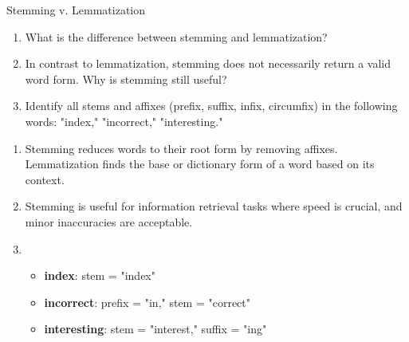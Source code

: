 \documentclass{article}
\begin{document}
\begin{exercise}{Stemming v. Lemmatization}\label{ex:stem-v-lemm}
  \begin{enumerate}
    \item What is the difference between stemming and lemmatization?
    \item In contrast to lemmatization, stemming does not necessarily return a valid word form. Why is stemming still useful?
    \item Identify all stems and affixes (prefix, suffix, infix, circumfix) in the following words: "index," "incorrect," "interesting."
  \end{enumerate}

  \begin{solution}
    \begin{enumerate}
        \item Stemming reduces words to their root form by removing affixes. Lemmatization finds the base or dictionary form of a word based on its context.
        \item Stemming is useful for information retrieval tasks where speed is crucial, and minor inaccuracies are acceptable.
        \item \begin{itemize}
            \item \textbf{index}: stem = "index"
            \item \textbf{incorrect}: prefix = "in," stem = "correct"
            \item \textbf{interesting}: stem = "interest," suffix = "ing"
        \end{itemize}
    \end{enumerate}
  \end{solution}
\end{exercise}
\end{document}
